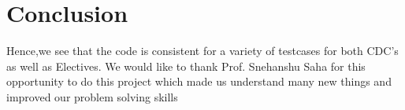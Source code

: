 \documentclass{article}
\begin{document}
\section{Conclusion}Hence,we see that the code is consistent for a variety of testcases for both CDC's as well as Electives.
We would like to thank Prof. Snehanshu Saha for this opportunity to do this project which made  us understand many new things and improved our problem solving skills 
\end{document}
